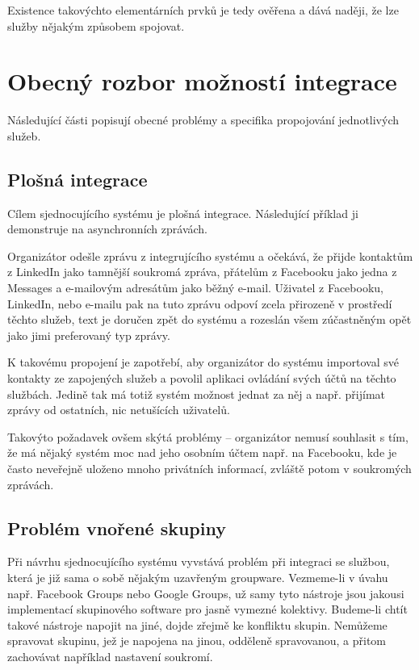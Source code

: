\documentclass[12pt,oneside,final]{fithesis2}
\begin{document}
Existence takovýchto elementárních prvků je tedy ověřena a dává naději, že lze služby nějakým způsobem spojovat.


\section{Obecný rozbor možností integrace}
Následující části popisují obecné problémy a specifika propojování jednotlivých služeb.

\subsection{Plošná integrace}
Cílem sjednocujícího systému je plošná integrace. Následující příklad ji demonstruje na asynchronních zprávách.

Organizátor odešle zprávu z integrujícího systému a očekává, že přijde kontaktům z LinkedIn jako tamnější soukromá zpráva, přátelům z Facebooku jako jedna z Messages a e-mailovým adresátům jako běžný e-mail. Uživatel z Facebooku, LinkedIn, nebo e-mailu pak na tuto zprávu odpoví zcela přirozeně v prostředí těchto služeb, text je doručen zpět do systému a rozeslán všem zúčastněným opět jako jimi preferovaný typ zprávy.

K takovému propojení je zapotřebí, aby organizátor do systému importoval své kontakty ze zapojených služeb a povolil aplikaci ovládání svých účtů na těchto službách. Jedině tak má totiž systém možnost jednat za něj a např. přijímat zprávy od ostatních, nic netušících uživatelů.

Takovýto požadavek ovšem skýtá problémy -- organizátor nemusí souhlasit s tím, že má nějaký systém moc nad jeho osobním účtem např. na Facebooku, kde je často neveřejně uloženo mnoho privátních informací, zvláště potom v soukromých zprávách.

\subsection{Problém vnořené skupiny}
Při návrhu sjednocujícího systému vyvstává problém při integraci se službou, která je již sama o sobě nějakým uzavřeným groupware. Vezmeme-li v úvahu např. Facebook Groups nebo Google Groups, už samy tyto nástroje jsou jakousi implementací skupinového software pro jasně vymezné kolektivy. Budeme-li chtít takové nástroje napojit na jiné, dojde zřejmě ke konfliktu skupin. Nemůžeme spravovat skupinu, jež je napojena na jinou, odděleně spravovanou, a přitom zachovávat například nastavení soukromí.
\end{document}
